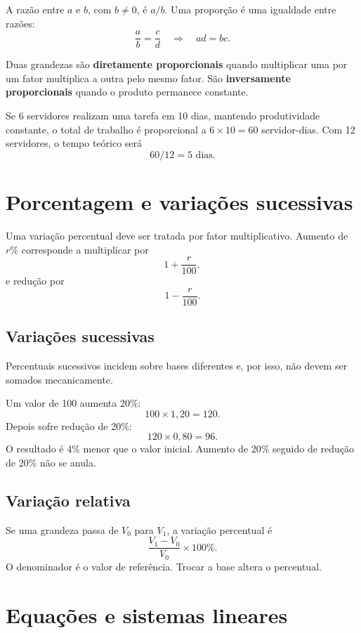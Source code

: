 A razão entre $a$ e $b$, com $b\neq0$, é $a/b$. Uma proporção é uma igualdade entre razões:
\[
\frac{a}{b}=\frac{c}{d}\quad\Longrightarrow\quad ad=bc.
\]

Duas grandezas são \textbf{diretamente proporcionais} quando multiplicar uma por um fator multiplica a outra pelo mesmo fator. São \textbf{inversamente proporcionais} quando o produto permanece constante.

\begin{exemplo}
Se 6 servidores realizam uma tarefa em 10 dias, mantendo produtividade constante, o total de trabalho é proporcional a $6\times10=60$ servidor-dias. Com 12 servidores, o tempo teórico será
\[
60/12=5\text{ dias}.
\]
\end{exemplo}

\section{Porcentagem e variações sucessivas}

Uma variação percentual deve ser tratada por fator multiplicativo. Aumento de $r\%$ corresponde a multiplicar por
\[
1+\frac{r}{100},
\]
e redução por
\[
1-\frac{r}{100}.
\]

\subsection{Variações sucessivas}

Percentuais sucessivos incidem sobre bases diferentes e, por isso, não devem ser somados mecanicamente.

\begin{exemplo}
Um valor de 100 aumenta 20\%:
\[
100\times1{,}20=120.
\]
Depois sofre redução de 20\%:
\[
120\times0{,}80=96.
\]
O resultado é 4\% menor que o valor inicial. Aumento de 20\% seguido de redução de 20\% não se anula.
\end{exemplo}

\subsection{Variação relativa}

Se uma grandeza passa de $V_0$ para $V_1$, a variação percentual é
\[
\frac{V_1-V_0}{V_0}\times100\%.
\]
O denominador é o valor de referência. Trocar a base altera o percentual.

\section{Equações e sistemas lineares}

